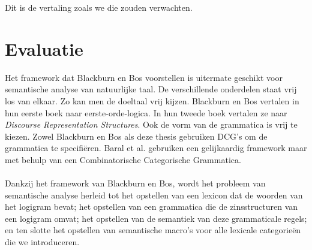 Dit is de vertaling zoals we die zouden verwachten.

\section{Evaluatie}
Het framework dat Blackburn en Bos voorstellen is uitermate geschikt voor semantische analyse van natuurlijke taal. De verschillende onderdelen staat vrij los van elkaar. Zo kan men de doeltaal vrij kijzen. Blackburn en Bos vertalen in hun eerste boek \cite{Blackburn2005} naar eerste-orde-logica. In hun tweede boek \cite{Blackburn2006} vertalen ze naar \textit{Discourse Representation Structures}. Ook de vorm van de grammatica is vrij te kiezen. Zowel Blackburn en Bos als deze thesis gebruiken DCG's om de grammatica te specifiëren. Baral et al. \cite{Baral2008} gebruiken een gelijkaardig framework maar met behulp van een Combinatorische Categorische Grammatica.

\paragraph{} Dankzij het framework van Blackburn en Bos, wordt het probleem van semantische analyse herleid tot het opstellen van een lexicon dat de woorden van het logigram bevat; het opstellen van een grammatica die de zinsstructuren van een logigram omvat; het opstellen van de semantiek van deze grammaticale regels; en ten slotte het opstellen van semantische macro's voor alle lexicale categorieën die we introduceren.
